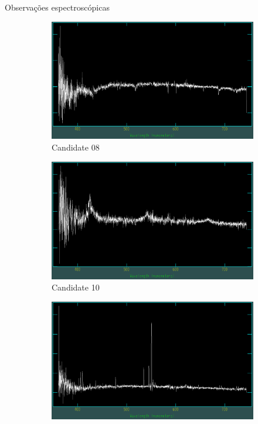 \begin{frame}[c]{Observações espectroscópicas}
\begin{figure}
    \captionsetup{justification=centering}
    \centering
    \begin{subfigure}[b]{0.31\textwidth}
        \includegraphics[width=\textwidth]{images/espectros/UCG08.png}
        \caption{Candidate 08}
    \end{subfigure}
    \begin{subfigure}[b]{0.31\textwidth}
        \includegraphics[width=\textwidth]{images/espectros/UCG10.png}
        \caption{Candidate 10}
    \end{subfigure}
    \begin{subfigure}[b]{0.31\textwidth}
        \includegraphics[width=\textwidth]{images/espectros/UCG12.png}

\end{subfigure}
\end{figure}
\end{frame}
